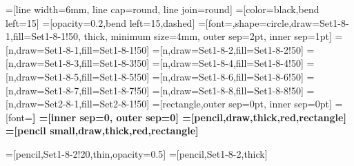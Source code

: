 \documentclass[hide notes,compress]{beamer}
\begin{document}
=[line width=6mm, line cap=round, line join=round]
=[color=black,bend left=15]
=[opacity=0.2,bend left=15,dashed]
=[font=\tiny,shape=circle,draw=Set1-8-1,fill=Set1-8-1!50, thick,
               minimum size=4mm, outer sep=2pt, inner sep=1pt]
=[n,draw=Set1-8-1,fill=Set1-8-1!50]
=[n,draw=Set1-8-2,fill=Set1-8-2!50]
=[n,draw=Set1-8-3,fill=Set1-8-3!50]
=[n,draw=Set1-8-4,fill=Set1-8-4!50]
=[n,draw=Set1-8-5,fill=Set1-8-5!50]
=[n,draw=Set1-8-6,fill=Set1-8-6!50]
=[n,draw=Set1-8-7,fill=Set1-8-7!50]
=[n,draw=Set1-8-8,fill=Set1-8-8!50]
=[n,draw=Set2-8-1,fill=Set2-8-1!50]
=[rectangle,outer sep=0pt, inner sep=0pt]
=[font=\large\sffamily\bfseries]
=[inner sep=0, outer sep=0]
=[pencil,draw,thick,red,rectangle]
=[pencil small,draw,thick,red,rectangle]

=[pencil,Set1-8-2!20,thin,opacity=0.5]
=[pencil,Set1-8-2,thick]

\end{document}
